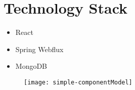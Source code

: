 \section{Technology Stack}

\begin{itemize}
    \item React
    \item Spring Webflux
    \item MongoDB
\end{itemize}

\begin{figure}
    \texttt{[image: simple-componentModel]}
\end{figure}